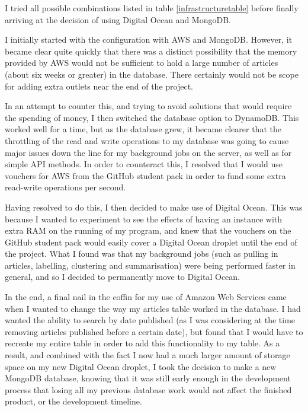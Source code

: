 \documentclass[12pt]{article}
\begin{document}
I tried all possible combinations listed in table \ref{infrastructuretable} before finally arriving at the decision of using Digital Ocean and MongoDB.

I initially started with the configuration with AWS and MongoDB. However, it became clear quite quickly that there was a distinct possibility that the memory provided by AWS would not be sufficient to hold a large number of articles (about six weeks or greater) in the database. There certainly would not be scope for adding extra outlets near the end of the project.

In an attempt to counter this, and trying to avoid solutions that would require the spending of money, I then switched the database option to DynamoDB. This worked well for a time, but as the database grew, it became clearer that the throttling of the read and write operations to my database was going to cause major issues down the line for my background jobs on the server, as well as for simple API methods. In order to counteract this, I resolved that I would use vouchers for AWS from the GitHub student pack in order to fund some extra read-write operations per second.

Having resolved to do this, I then decided to make use of Digital Ocean. This was because I wanted to experiment to see the effects of having an instance with extra RAM on the running of my program, and knew that the vouchers on the GitHub student pack would easily cover a Digital Ocean droplet until the end of the project. What I found was that my background jobs (such as pulling in articles, labelling, clustering and summarisation) were being performed faster in general, and so I decided to permanently move to Digital Ocean.

In the end, a final nail in the coffin for my use of Amazon Web Services came when I wanted to change the way my articles table worked in the database. I had wanted the ability to search by date published (as I was considering at the time removing articles published before a certain date), but found that I would have to recreate my entire table in order to add this functionality to my table. As a result, and combined with the fact I now had a much larger amount of storage space on my new Digital Ocean droplet, I took the decision to make a new MongoDB database, knowing that it was still early enough in the development process that losing all my previous database work would not affect the finished product, or the development timeline.
\end{document}
